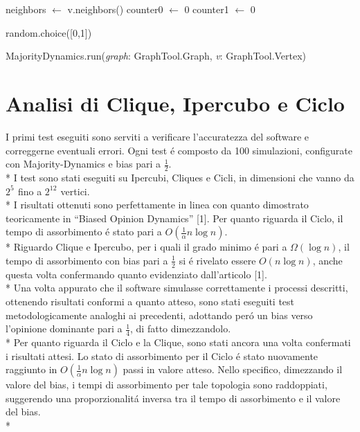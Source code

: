 \documentclass[../Tesi.tex]{subfiles}
\begin{document}
\begin{algorithm}[H]
  neighbors $\gets$ v.neighbors()\;
  counter0 $\gets$ 0\;
  counter1 $\gets$ 0\;
  
  
  \Return random.choice([0,1])$\;$
\caption{MajorityDynamics.run(\emph{graph}: GraphTool.Graph, \emph{v}: GraphTool.Vertex)}
\end{algorithm}

\section{Analisi di Clique, Ipercubo e Ciclo}
I primi test eseguiti sono serviti a verificare l'accuratezza del software e correggerne eventuali errori. Ogni test \'e composto da 100 simulazioni, configurate con Majority-Dynamics e bias pari a $\frac{1}{2}$.\\*
I test sono stati eseguiti su Ipercubi, Cliques e Cicli, in dimensioni che vanno da $2^{5^{\mathrm{}}}$ fino a $2^{12^{\mathrm{}}}$ vertici.\\*
I risultati ottenuti sono perfettamente in linea con quanto dimostrato teoricamente in  ``Biased Opinion Dynamics'' [1]. Per quanto riguarda il Ciclo, il tempo di assorbimento \'e stato pari a $O(\frac{1}{\alpha}n\log{}n)$. \\*
Riguardo Clique e Ipercubo, per i quali il grado minimo \'e pari a $\Omega(\log{}n)$, il tempo di assorbimento con bias pari a $\frac{1}{2}$ si \'e rivelato essere $O(n\log{}n)$, anche questa volta confermando quanto evidenziato dall'articolo [1].\\*
Una volta appurato che il software simulasse correttamente i processi descritti, ottenendo risultati conformi a quanto atteso, sono stati eseguiti test metodologicamente analoghi ai precedenti, adottando per\'o un bias verso l'opinione dominante pari a $\frac{1}{4}$, di fatto dimezzandolo.\\*
Per quanto riguarda il Ciclo e la Clique, sono stati ancora una volta confermati i risultati attesi.
Lo stato di assorbimento per il Ciclo \'e stato nuovamente raggiunto in $O(\frac{1}{\alpha}n\log{}n)$ passi in valore atteso. Nello specifico, dimezzando il valore del bias, i tempi di assorbimento per tale topologia sono raddoppiati, suggerendo una proporzionalit\'a inversa tra il tempo di assorbimento e il valore del bias.\\*
\end{document}
